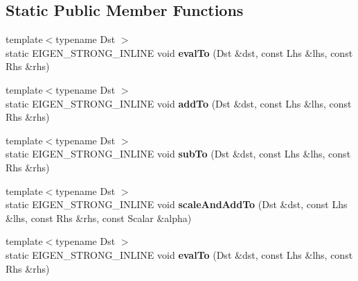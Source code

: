 \subsection*{Static Public Member Functions}
\begin{DoxyCompactItemize}
\item 
\mbox{\label{struct_eigen_1_1internal_1_1generic__product__impl__base_a40bba8fa62c77f319ea8b5880a8a9199}} 
{\footnotesize template$<$typename Dst $>$ }\\static E\+I\+G\+E\+N\+\_\+\+S\+T\+R\+O\+N\+G\+\_\+\+I\+N\+L\+I\+NE void {\bfseries eval\+To} (Dst \&dst, const Lhs \&lhs, const Rhs \&rhs)
\item 
\mbox{\label{struct_eigen_1_1internal_1_1generic__product__impl__base_ab7918338c4d9526139bc891a96ee9ae0}} 
{\footnotesize template$<$typename Dst $>$ }\\static E\+I\+G\+E\+N\+\_\+\+S\+T\+R\+O\+N\+G\+\_\+\+I\+N\+L\+I\+NE void {\bfseries add\+To} (Dst \&dst, const Lhs \&lhs, const Rhs \&rhs)
\item 
\mbox{\label{struct_eigen_1_1internal_1_1generic__product__impl__base_a30e06eff6da25a65944a59070271174c}} 
{\footnotesize template$<$typename Dst $>$ }\\static E\+I\+G\+E\+N\+\_\+\+S\+T\+R\+O\+N\+G\+\_\+\+I\+N\+L\+I\+NE void {\bfseries sub\+To} (Dst \&dst, const Lhs \&lhs, const Rhs \&rhs)
\item 
\mbox{\label{struct_eigen_1_1internal_1_1generic__product__impl__base_a7312930df275f11db3fc4388c3e1819e}} 
{\footnotesize template$<$typename Dst $>$ }\\static E\+I\+G\+E\+N\+\_\+\+S\+T\+R\+O\+N\+G\+\_\+\+I\+N\+L\+I\+NE void {\bfseries scale\+And\+Add\+To} (Dst \&dst, const Lhs \&lhs, const Rhs \&rhs, const Scalar \&alpha)
\item 
\mbox{\label{struct_eigen_1_1internal_1_1generic__product__impl__base_a40bba8fa62c77f319ea8b5880a8a9199}} 
{\footnotesize template$<$typename Dst $>$ }\\static E\+I\+G\+E\+N\+\_\+\+S\+T\+R\+O\+N\+G\+\_\+\+I\+N\+L\+I\+NE void {\bfseries eval\+To} (Dst \&dst, const Lhs \&lhs, const Rhs \&rhs)

\end{DoxyCompactItemize}
